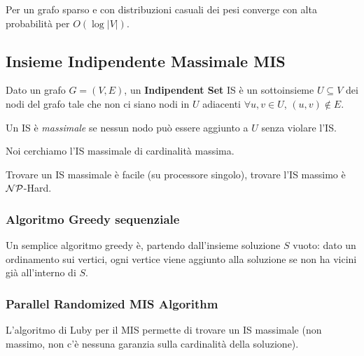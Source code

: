 Per un grafo sparso e con distribuzioni casuali dei pesi converge con alta probabilità per $O(\log |V|)$.

\subsection{Insieme Indipendente Massimale MIS}

Dato un grafo $G = (V,E)$, un \textbf{Indipendent Set} IS è un sottoinsieme $U \subseteq V$ dei nodi del grafo tale che non ci siano nodi in $U$ adiacenti $\forall u,v \in U$, $(u,v) \notin E$.

Un IS è \textit{massimale} se nessun nodo può essere aggiunto a $U$ senza violare l'IS.

Noi cerchiamo l'IS massimale di cardinalità massima.

Trovare un IS massimale è facile (su processore singolo), trovare l'IS massimo è $\mathcal{NP}$-Hard.

\subsubsection{Algoritmo Greedy sequenziale}

Un semplice algoritmo greedy è, partendo dall'insieme soluzione $S$ vuoto: dato un ordinamento sui vertici, ogni vertice viene aggiunto alla soluzione se non ha vicini già all'interno di $S$.

\subsubsection{Parallel Randomized MIS Algorithm}

L'algoritmo di Luby per il MIS permette di trovare un IS massimale (non massimo, non c'è nessuna garanzia sulla cardinalità della soluzione). 

